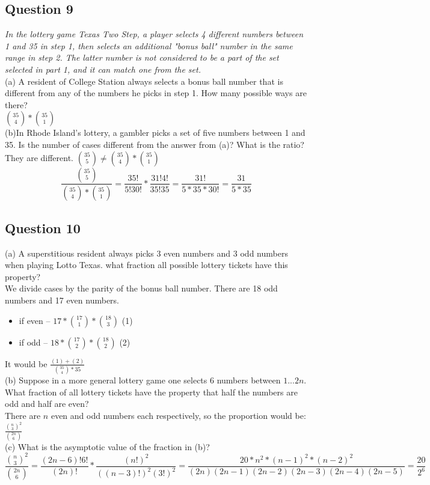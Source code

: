 \documentclass{article}
\begin{document}
\subsection{Question 9}
\emph{In the lottery game Texas Two Step, a player selects 4 different numbers between 1 and 35 in step 1, then selects an additional "bonus ball" number in the same range in step 2. The latter number is not considered to be a part of the set selected in part 1, and it can match one from the set.}
\\
\medskip
(a) A resident of College Station always selects a bonus ball number that is different from any of the numbers he picks in step 1. How many possible ways are there?
\\
\medskip
${35\choose4}*{35\choose1}$
\\
\medskip
(b)In Rhode Island's lottery, a gambler picks a set of five numbers between 1 and 35. Is the number of cases different from the answer from (a)? What is the ratio?
\\
\medskip
They are different. ${35\choose5} \neq {35\choose4}*{35\choose1}$
\\
\medskip
$$
\frac{{35\choose5}}{{35\choose4}*{35\choose1}} = \frac{35!}{5!30!} * \frac{31! 4!}{35!35} = \frac{31!}{5*35*30!} = \frac{31}{5*35} 
$$
\newpage
\subsection{Question 10}
\medskip
(a) A superstitious resident always picks 3 even numbers and 3 odd numbers when playing Lotto Texas. what fraction all possible lottery tickets have this property?
\\
\medskip
We divide cases by the parity of the bonus ball number. There are 18 odd numbers and 17 even numbers.
\begin{itemize}
    \item if even --  $17*{17 \choose 1} * {18 \choose 3}$ (1)
    \item if odd -- $18*{17 \choose 2} * {18 \choose 2}$ (2)
\end{itemize}
It would be $\frac{(1)+(2)}{{35\choose4}*35}$
\\
\bigskip
(b) Suppose in a more general lottery game one selects 6 numbers between $1...2n$. What fraction of all lottery tickets have the property that half the numbers are odd and half are even?
\\
\medskip
There are $n$ even and odd numbers each respectively, so the proportion would be:
$\frac{{n\choose3}^2}{{2n\choose6}}$
\\
\bigskip
(c) What is the asymptotic value of the fraction in (b)?
\\
\medskip
$$
\frac{{n\choose3}^2}{{2n\choose6}} = \frac{(2n-6)! 6! }{(2n)!} * \frac{(n!)^2}{((n-3)!)^2 (3!)^2} = \frac{20* n^2 * (n-1)^2 * (n-2)^2}{(2n)(2n-1)(2n-2)(2n-3)(2n-4)(2n-5)} = \frac{20}{2^6}
$$
\end{document}

